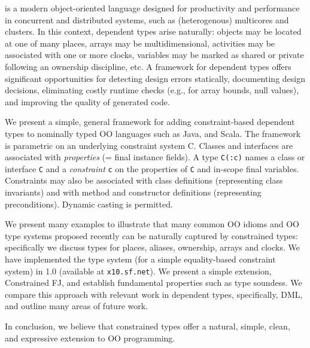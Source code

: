 \Xten{} is a modern object-oriented language designed for productivity
and performance in concurrent and distributed systems, such as
(heterogenous) multicores and clusters. In this context, dependent
types arise naturally: objects may be located at one of many places,
arrays may be multidimensional, activities may be associated with one
or more clocks, variables may be marked as shared or private following
an ownership discipline, etc.  A framework for dependent types offers
significant opportunities for detecting design errors statically,
documenting design decisions, eliminating costly runtime checks
(e.g., for array bounds, null values), and improving the quality of
generated code.

We present a simple, general framework for adding constraint-based
dependent types to nominally typed OO languages such as Java, \Xten{}
and Scala. The framework is parametric on an underlying constraint
system {\cal C}. Classes and interfaces are associated with {\em
properties} (= final instance fields). A type {\tt C(:c)} names a class
or interface {\tt C} and a {\em constraint} {\tt c} on the
properties of {\tt C} and in-scope final variables.  Constraints
may also be associated with class definitions (representing
class invariants) and with method and constructor definitions
(representing preconditions). Dynamic casting is permitted.

We present many examples to illustrate that many common OO idioms and
OO type systems proposed recently can be naturally captured by
constrained types: specifically we discuss types for places, aliases,
ownership, arrays and clocks. We have implemented the type system (for
a simple equality-based constraint system) in \Xten{} 1.0 (available
at {\tt x10.sf.net}). We present a simple \FJ{} extension,
Constrained FJ, and establish fundamental properties such as type
soundess. We compare this approach with relevant work in dependent
types, specifically, DML, and outline many areas of future work.

In conclusion, we believe that constrained types offer a natural,
simple, clean, and expressive extension to OO programming.
